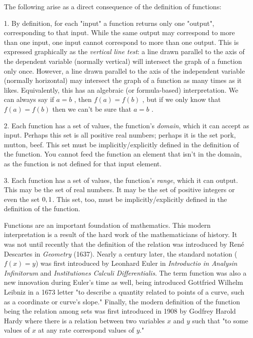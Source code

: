 The following arise as a direct consequence of the definition of functions:



1.  By definition, for each "input" a function returns only one "output", corresponding to
that input. While the same output may correspond to more than one input, one input cannot
correspond to more than one output. This is expressed graphically as the \textit{vertical
line test}: a line drawn parallel to the axis of the dependent variable (normally
vertical) will intersect the graph of a function only once. However, a line drawn parallel
to the axis of the independent variable (normally horizontal) may intersect the graph of a
function as many times as it likes. Equivalently, this has an algebraic (or formula-based)
interpretation. We can always say if $a=b$ , then $f(a)=f(b)$ , but if we only know that
$f(a)=f(b)$ then we can't be sure that $a=b$ .

2.  Each function has a set of values, the function's \textit{domain}, which it can accept
as input. Perhaps this set is all positive real numbers; perhaps it is the set {pork,
mutton, beef}. This set must be implicitly/explicitly defined in the definition of the
function. You cannot feed the function an element that isn't in the domain, as the
function is not defined for that input element.

3.  Each function has a set of values, the function's \textit{range}, which it can output.
This may be the set of real numbers. It may be the set of positive integers or even the
set $\\{0,1\\}$. This set, too, must be implicitly/explicitly defined in the definition of
the function.



Functions are an important foundation of mathematics. This modern interpretation is a
result of the hard work of the mathematicians of history. It was not until recently that
the definition of the relation was introduced by René Descartes in \textit{Geometry}
(1637). Nearly a century later, the standard notation ($f(x)=y$) was first introduced by
Leonhard Euler in \textit{Introductio in Analysin Infinitorum} and \textit{Institutiones
Calculi Differentialis}. The term function was also a new innovation during Euler's time
as well, being introduced Gottfried Wilhelm Leibniz in a 1673 letter "to describe a
quantity related to points of a curve, such as a coordinate or curve's slope." Finally,
the modern definition of the function being the relation among sets was first introduced
in 1908 by Godfrey Harold Hardy where there is a relation between two variables $x$ and
$y$ such that "to some values of $x$ at any rate correspond values of $y$."




